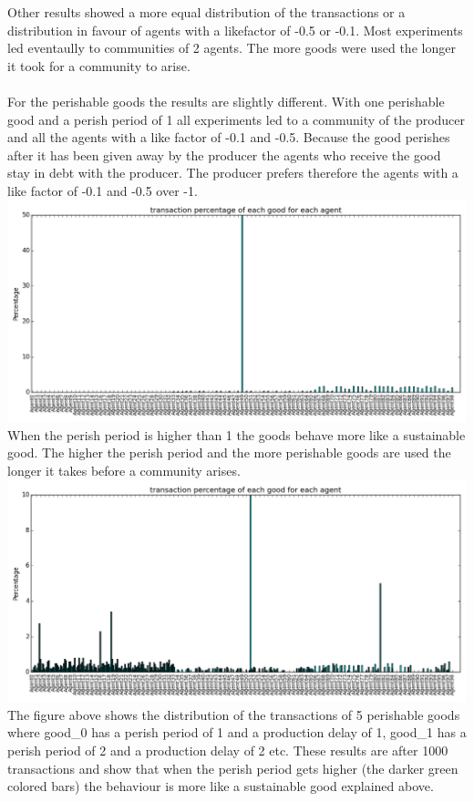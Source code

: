 \documentclass[twoside,openright]{uva-bachelor-thesis}
\begin{document}
Other results showed a more equal distribution of the transactions or a distribution in favour of agents with a likefactor of -0.5 or -0.1. Most experiments led eventaully to communities of 2 agents. The more goods were used the longer it took for a community to arise. \\
\\
For the perishable goods the results are slightly different. With one perishable good and a perish period of 1 all experiments led to a community of the producer and all the agents with a like factor of -0.1 and -0.5. Because the good perishes after it has been given away by the producer the agents who receive the good stay in debt with the producer. The producer prefers therefore the agents with a like factor of -0.1 and -0.5 over -1. \\
\includegraphics[scale=0.5]{GR_L1B2N1/1000transactions1perishable1-1}
When the perish period is higher than 1 the goods behave more like a sustainable good. The higher the perish period and the more perishable goods are used the longer it takes before a community arises.\\
\includegraphics[scale=0.5]{GR_L1B2N1/1000transactions5perishable}
The figure above shows the distribution of the transactions of 5 perishable goods where good\_0 has a perish period of 1 and a production delay of 1, good\_1 has a perish period of 2 and a production delay of 2 etc. These results are after 1000 transactions and show that when the perish period gets higher (the darker green colored bars) the behaviour is more like a sustainable good explained above.
\end{document}
